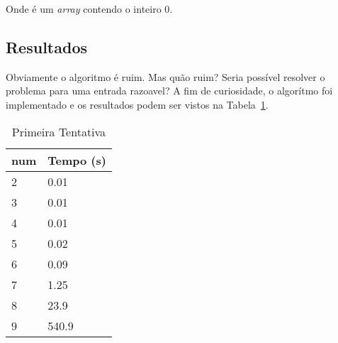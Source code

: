 \documentclass[12pt]{article}
\begin{document}
Onde {\sf [0]} é um {\em array} contendo o inteiro $0$.



\subsection{Resultados}\label{section:primeira:resultados}
Obviamente o algoritmo é ruim. Mas quão ruim? Seria possível resolver o problema para uma entrada razoavel? A fim de curiosidade, o algorítmo foi implementado e os resultados podem ser vistos na Tabela~\ref{table:resultados-1}.

\begin{table}[h]
\caption{Primeira Tentativa}
\label{table:resultados-1}
\begin{tabular}{ll}
  {\sf num} & Tempo (s) \\
  \hline
  2 & 0.01 \\
  3 & 0.01 \\
  4 & 0.01 \\
  5 & 0.02 \\
  6 & 0.09 \\
  7 & 1.25 \\
  8 & 23.9 \\
  9 & 540.9    
\end{tabular}
\end{table}
\end{document}
